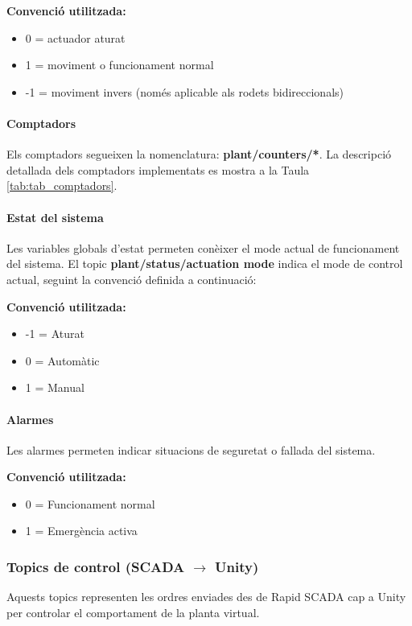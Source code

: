 \documentclass[a4paper,11pt,DIV=13,headings=normal,abstract=true,twoside=semi]{article}
\begin{document}
\textbf{Convenció utilitzada:}

\begin{itemize}
\item 0 = actuador aturat
\item 1 = moviment o funcionament normal
\item -1 = moviment invers (només aplicable als rodets bidireccionals)
\end{itemize}


\paragraph{Comptadors}
Els comptadors segueixen la nomenclatura: \textbf{plant/counters/*}. La descripció detallada dels comptadors implementats es mostra a la Taula \ref{tab:tab_comptadors}.

\paragraph{Estat del sistema}

Les variables globals d'estat permeten conèixer el mode actual de funcionament del sistema. El topic \textbf{plant/status/actuation mode} indica el mode de control actual, seguint la convenció definida a continuació:

\textbf{Convenció utilitzada:}

\begin{itemize}
\item -1 = Aturat
\item 0 = Automàtic
\item 1 = Manual
\end{itemize}


\paragraph{Alarmes}

Les alarmes permeten indicar situacions de seguretat o fallada del sistema.

\textbf{Convenció utilitzada:}

\begin{itemize}
\item 0 = Funcionament normal
\item 1 = Emergència activa
\end{itemize}

\subsubsection{Topics de control (SCADA $\rightarrow$ Unity)}
Aquests topics representen les ordres enviades des de Rapid SCADA cap a Unity per controlar el comportament de la planta virtual.
\end{document}
